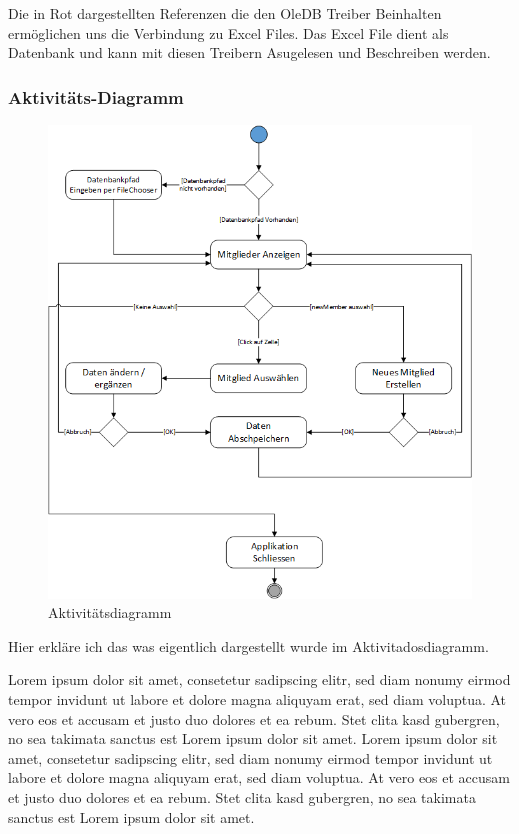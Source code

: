 \documentclass{article}
\begin{document}
Die in Rot dargestellten Referenzen die den OleDB Treiber Beinhalten ermöglichen uns die Verbindung zu Excel Files. Das Excel File dient als Datenbank und kann mit diesen Treibern Asugelesen und Beschreiben werden.


\newpage

\subsubsection{Aktivitäts-Diagramm}
\begin{figure}[h]
	\centering
	\includegraphics[width=0.8 \textwidth]{Aktivtaetsdiagramm}
	\caption{Aktivitätsdiagramm}
\end{figure}

Hier erkläre ich das was eigentlich dargestellt wurde im Aktivitadosdiagramm.

Lorem ipsum dolor sit amet, consetetur sadipscing elitr, sed diam nonumy eirmod tempor invidunt ut labore et dolore magna aliquyam erat, sed diam voluptua. At vero eos et accusam et justo duo dolores et ea rebum. Stet clita kasd gubergren, no sea takimata sanctus est Lorem ipsum dolor sit amet. Lorem ipsum dolor sit amet, consetetur sadipscing elitr, sed diam nonumy eirmod tempor invidunt ut labore et dolore magna aliquyam erat, sed diam voluptua. At vero eos et accusam et justo duo dolores et ea rebum. Stet clita kasd gubergren, no sea takimata sanctus est Lorem ipsum dolor sit amet.
\end{document}
